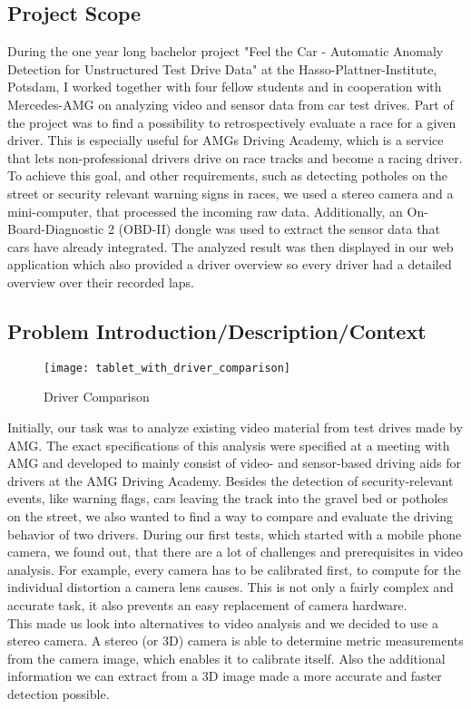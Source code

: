 \subsection{Project Scope}
During the one year long bachelor project "Feel the Car - Automatic Anomaly Detection for Unstructured Test Drive Data" at the Hasso-Plattner-Institute, Potsdam, I worked together with four fellow students and in cooperation with Mercedes-AMG on analyzing video and sensor data from car test drives.
Part of the project was to find a possibility to retrospectively evaluate a race for a given driver. This is especially useful for AMGs Driving Academy, which is a service that lets non-professional drivers drive on race tracks and become a racing driver. To achieve this goal, and other requirements, such as detecting potholes on the street or security relevant warning signs in races, we used a stereo camera and a mini-computer, that processed the incoming raw data.
Additionally, an On-Board-Diagnostic 2 (OBD-II) dongle was used to extract the sensor data that cars have already integrated.
The analyzed result was then displayed in our web application which also provided a driver overview so every driver had a detailed overview over their recorded laps.
\clearpage

\subsection{Problem Introduction/Description/Context}

\begin{figure}[!ht]
	\centering
	\texttt{[image: tablet\_with\_driver\_comparison]}
	\caption{Driver Comparison}
	\label{fig:comparison_with_overlay}
\end{figure}

Initially, our task was to analyze existing video material from test drives made by AMG. The exact specifications of this analysis were specified at a meeting with AMG and developed to mainly consist of video- and sensor-based driving aids for drivers at the AMG Driving Academy. Besides the detection of security-relevant events, like warning flags, cars leaving the track into the gravel bed or potholes on the street, we also wanted to find a way to compare and evaluate the driving behavior of two drivers.
During our first tests, which started with a mobile phone camera, we found out, that there are a lot of challenges and prerequisites in video analysis. For example, every camera has to be calibrated first, to compute for the individual distortion a camera lens causes. This is not only a fairly complex and accurate task, it also prevents an easy replacement of camera hardware.\\
This made us look into alternatives to video analysis and we decided to use a stereo camera. A stereo (or 3D) camera is able to determine metric measurements from the camera image, which enables it to calibrate itself. Also the additional information we can extract from a 3D image made a more accurate and faster detection possible.\\

